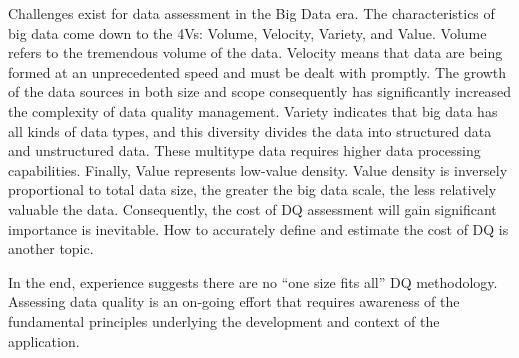 \documentclass[pdftex,english,oribibl]{llncs}
\begin{document}
Challenges exist for data assessment in the Big Data era. \cite{Katal2013BigData} The characteristics of big data come down to the 4Vs: Volume, Velocity, Variety, and Value. Volume refers to the tremendous volume of the data. Velocity means that data are being formed at an unprecedented speed and must be dealt with promptly.   The growth of the data sources in both size and scope consequently has significantly increased the complexity of data quality management.
Variety indicates that big data has all kinds of data types, and this diversity divides the data into structured data and unstructured data. These multitype data requires higher data processing capabilities.
Finally, Value represents low-value density. Value density is inversely proportional to total data size, the greater the big data scale, the less relatively valuable the data. Consequently, the cost of DQ assessment will gain significant importance is inevitable. How to accurately define and estimate the cost of DQ is another topic.

In the end, experience suggests there are no  “one size fits all”  DQ methodology. Assessing data quality is an on-going effort that requires awareness of the fundamental principles underlying the development and context of the application.


\end{document}
